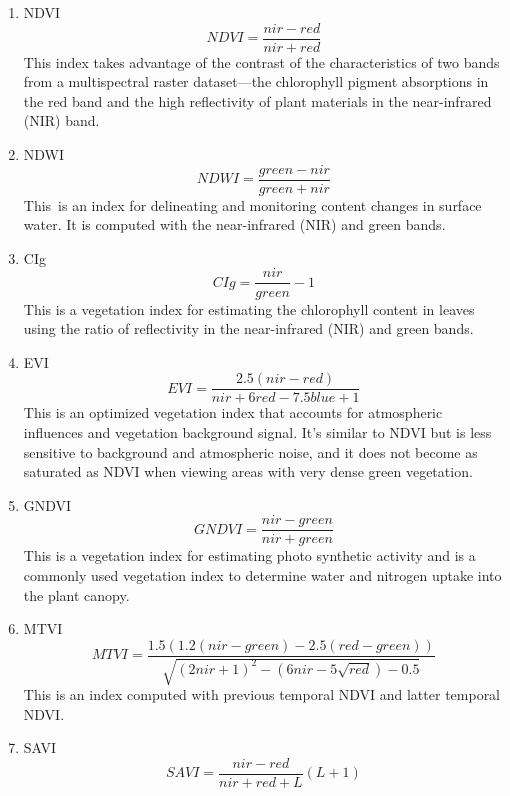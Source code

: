 \documentclass{isprs} %
\begin{document}
\begin{enumerate}
	\item NDVI
	\begin{equation}
		NDVI=\frac{nir-red}{nir+red}
	\end{equation}
	This index takes advantage of the contrast of the characteristics of two bands from a multispectral raster dataset—the chlorophyll pigment absorptions in the red band and the high reflectivity of plant materials in the near-infrared (NIR) band.
	\item NDWI
	\begin{equation}
		NDWI=\frac{green-nir}{green+nir}
	\end{equation}
	This is an index for delineating and monitoring content changes in surface water. It is computed with the near-infrared (NIR) and green bands.
	\item CIg
	\begin{equation}
		CIg=\frac{nir}{green}-1
	\end{equation}
	This is a vegetation index for estimating the chlorophyll content in leaves using the ratio of reflectivity in the near-infrared (NIR) and green bands. 
	\item EVI
	\begin{equation}
		EVI=\frac{2.5(nir-red)}{nir+6red-7.5blue+1}
	\end{equation}
	This is an optimized vegetation index that accounts for atmospheric influences and vegetation background signal. It's similar to NDVI but is less sensitive to background and atmospheric noise, and it does not become as saturated as NDVI when viewing areas with very dense green vegetation. 
	\item GNDVI
	\begin{equation}
		GNDVI=\frac{nir-green}{nir+green}
	\end{equation}
	This is a vegetation index for estimating photo synthetic activity and is a commonly used vegetation index to determine water and nitrogen uptake into the plant canopy. 
	\item MTVI
	\begin{equation}
		MTVI=\frac{1.5(1.2(nir-green)-2.5(red-green))}{\sqrt{(2nir+1)^2-(6nir-5\sqrt{red})-0.5}}
	\end{equation}
	This is an index computed with previous temporal NDVI and latter temporal NDVI.
	\item SAVI
	\begin{equation}
		SAVI=\frac{nir-red}{nir+red+L}(L+1)
	\end{equation}

\end{enumerate}
\end{document}
